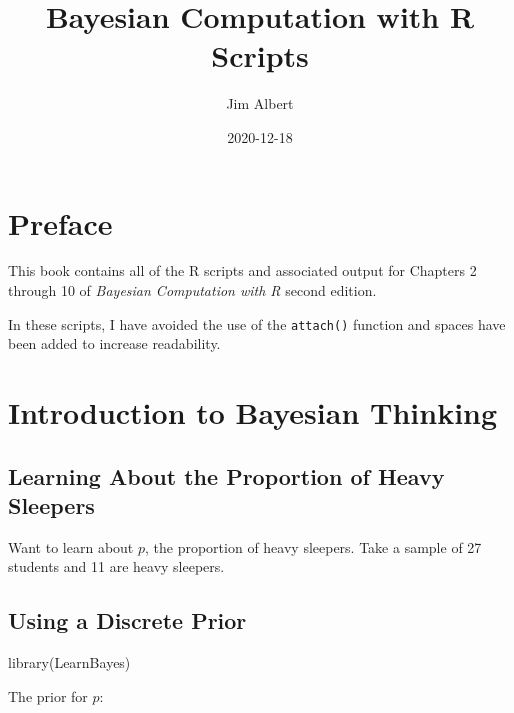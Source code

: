 \documentclass[
]{book}
\title{Bayesian Computation with R Scripts}
\author{Jim Albert}
\date{2020-12-18}
\newenvironment{Shaded}{\begin{snugshade}}{\end{snugshade}}
\newcommand{\FunctionTok}[1]{\textcolor[rgb]{0.00,0.00,0.00}{#1}}
\newcommand{\NormalTok}[1]{#1}
\begin{document}
\maketitle

{
\setcounter{tocdepth}{1}
\tableofcontents
}
\hypertarget{preface}{%
\chapter{Preface}\label{preface}}

This book contains all of the R scripts and associated output for Chapters 2 through 10 of \emph{Bayesian Computation with R} second edition.

In these scripts, I have avoided the use of the \texttt{attach()} function and spaces have been added to increase readability.

\hypertarget{introduction-to-bayesian-thinking}{%
\chapter{Introduction to Bayesian Thinking}\label{introduction-to-bayesian-thinking}}

\hypertarget{learning-about-the-proportion-of-heavy-sleepers}{%
\section{Learning About the Proportion of Heavy Sleepers}\label{learning-about-the-proportion-of-heavy-sleepers}}

Want to learn about \(p\), the proportion of heavy sleepers. Take a sample of 27 students and 11 are heavy sleepers.

\hypertarget{using-a-discrete-prior}{%
\section{Using a Discrete Prior}\label{using-a-discrete-prior}}

\begin{Shaded}
\begin{Highlighting}[]
\FunctionTok{library}\NormalTok{(LearnBayes)}
\end{Highlighting}
\end{Shaded}

The prior for \(p\):
\end{document}
